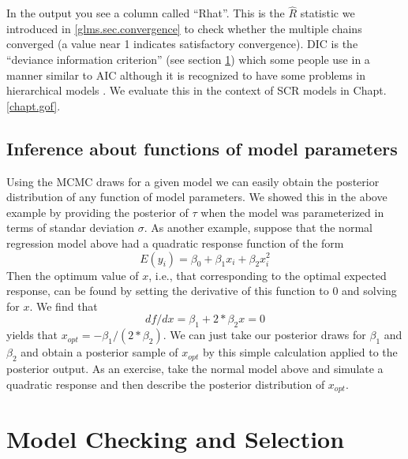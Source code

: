  In the {\WinBUGS} output you see a column called ``Rhat''. This is the $\hat{R}$ statistic we introduced in \ref{glms.sec.convergence} to check whether the multiple chains converged (a value near 1 indicates satisfactory convergence). DIC is the
``deviance information criterion'' \citep{spiegelhalter_etal:2002}
(see section \ref{glms.sec.modsel})
 which
some people use in a manner similar to AIC although it is recognized
to have some problems in hierarchical models \citep{millar:2009}. We
evaluate this in the context of SCR models in Chapt. \ref{chapt.gof}.




\subsection{Inference about functions of model parameters}
\label{glms.sec.xopt}

Using the MCMC draws for a given model we can easily obtain the
posterior distribution of any function of model parameters.  We showed
this in the above example by providing the posterior of $\tau$ when
the model was parameterized in terms of standar deviation $\sigma$.
 As another example, suppose that the
normal regression model above had a quadratic response function of the
form
\[
	E(y_i) = \beta_0 + \beta_1 x_i + \beta_2 x_{i}^{2}
\]
Then the optimum value of $x$, i.e., that corresponding to the optimal
expected response, can be found by setting the derivative of
this function to 0 and solving for $x$. We find that
\[
df/dx = \beta_1 +
2*\beta_2 x = 0
\]
yields that $x_{opt} = -\beta_1/(2*\beta_2)$.  We can just
take our posterior draws for $\beta_1$ and $\beta_2$ and obtain a
posterior sample of $x_{opt}$ by this simple calculation applied to
the posterior output. As an exercise, take
the normal model above and simulate a quadratic response and then
describe the posterior distribution of $x_{opt}$.


\section{Model Checking and Selection}
\label{glms.sec.modsel}

